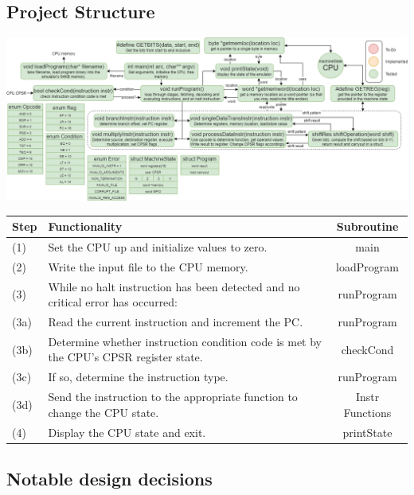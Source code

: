 \documentclass[11pt]{article}
\begin{document}
    \subsection*{Project Structure}
        \begin{center}
            \includegraphics[width = \textwidth]{project status}
        \end{center}
    \begin{center}
        \begin{tabular}{l | l | c}
            \textbf{Step} & \textbf{Functionality} & \textbf{Subroutine} \\
            \hline
            (1) & Set the CPU up and initialize values to zero. & \textcolor{OliveGreen}{main} \\
            (2) & Write the input file to the CPU memory. & \textcolor{OliveGreen}{loadProgram}\\
            (3) & While no halt instruction has been detected and no critical error has occurred: & \textcolor{OliveGreen}{runProgram} \\
            (3a) & Read the current instruction and increment the PC.  & \textcolor{OliveGreen}{runProgram}\\
            (3b) & Determine whether instruction condition code is met by the CPU's CPSR register state. & \textcolor{OliveGreen}{checkCond}\\
            (3c) & If so, determine the instruction type.  & \textcolor{OliveGreen}{runProgram}\\
            (3d) & Send the instruction to the appropriate function to change the CPU state. & \textcolor{OliveGreen}{Instr Functions}\\
            (4) & Display the CPU state and exit. & \textcolor{OliveGreen}{printState} \\
        \end{tabular}
    \end{center}
    
    \subsection*{Notable design decisions}
\end{document}
